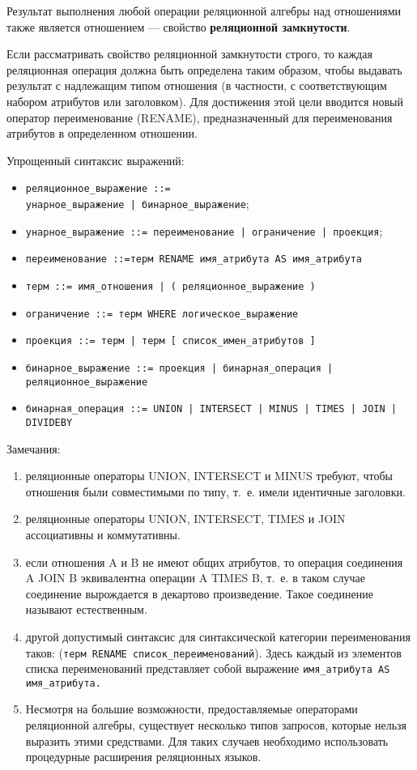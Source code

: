 Результат выполнения любой операции реляционной алгебры над отношениями также является отношением --- свойство \textbf{реляционной замкнутости}.

Если рассматривать свойство реляционной замкнутости строго, то каждая реляционная операция должна быть определена таким образом, чтобы выдавать результат с надлежащим типом отношения (в частности, с соответствующим набором атрибутов или заголовком). 
Для достижения этой цели вводится новый оператор переименование (RENAME), предназначенный для переименования атрибутов в определенном отношении.

\clearpage

Упрощенный синтаксис выражений:

\begin{itemize}[label*=--]
	\item \texttt{реляционное\_выражение ::= \\ унарное\_выражение | бинарное\_выражение};
	\item \texttt{унарное\_выражение ::= переименование | ограничение | проекция};
	\item \texttt{переименование ::=терм RENAME имя\_атрибута AS имя\_атрибута}
	\item \texttt{терм ::= имя\_отношения | ( реляционное\_выражение )}
	\item \texttt{ограничение ::= терм WHERE логическое\_выражение}
	\item \texttt{проекция ::= терм | терм [ список\_имен\_атрибутов ]}
	\item \texttt{бинарное\_выражение ::= проекция | бинарная\_операция | реляционное\_выражение}
	\item \texttt{бинарная\_операция ::= UNION | INТERSECT | MINUS | TIМES | JOIN |  \\ DIVIDEBY}
\end{itemize}

Замечания: 

\begin{enumerate}[label={\arabic*)}]
	\item реляционные операторы UNION, INTERSECT и MINUS требуют, чтобы отношения были совместимыми по типу, т.~е. имели идентичные заголовки.
	\item реляционные операторы UNION, INTERSECT, TIMES и JOIN ассоциативны и коммутативны.
	\item если отношения A и B не имеют общих атрибутов, то операция соединения A JOIN B эквивалентна операции A TIMES B, т.~е. в таком случае соединение вырождается в декартово произведение. 
	Такое соединение называют естественным.
	\item  другой допустимый синтаксис для синтаксической категории переименования таков: (\texttt{терм RENAМE список\_переименований}). 
	Здесь каждый из элементов списка переименований представляет собой выражение \texttt{имя\_атрибута AS имя\_атрибута.}
	\item  Несмотря на большие возможности, предоставляемые операторами реляционной алгебры, существует несколько типов запросов, которые нельзя выразить этими средствами. 
	Для таких случаев необходимо использовать
	процедурные расширения реляционных языков.
\end{enumerate}

